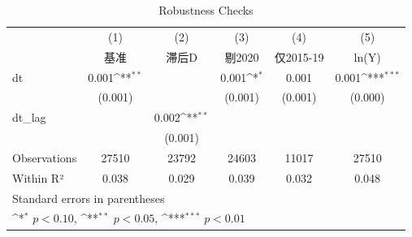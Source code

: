 \begin{table}[htbp]\centering
\def\sym#1{\ifmmode^{#1}\else\(^{#1}\)\fi}
\caption{Robustness Checks}
\begin{tabular}{l*{5}{c}}
\hline\hline
            &\multicolumn{1}{c}{(1)}&\multicolumn{1}{c}{(2)}&\multicolumn{1}{c}{(3)}&\multicolumn{1}{c}{(4)}&\multicolumn{1}{c}{(5)}\\
            &\multicolumn{1}{c}{基准}&\multicolumn{1}{c}{滞后D}&\multicolumn{1}{c}{剔2020}&\multicolumn{1}{c}{仅2015-19}&\multicolumn{1}{c}{ln(Y)}\\
\hline
dt          &       0.001\sym{**} &                     &       0.001\sym{*}  &       0.001         &       0.001\sym{***}\\
            &     (0.001)         &                     &     (0.001)         &     (0.001)         &     (0.000)         \\
[1em]
dt\_lag      &                     &       0.002\sym{**} &                     &                     &                     \\
            &                     &     (0.001)         &                     &                     &                     \\
\hline
Observations&       27510         &       23792         &       24603         &       11017         &       27510         \\
Within R²   &       0.038         &       0.029         &       0.039         &       0.032         &       0.048         \\
\hline\hline
\multicolumn{6}{l}{\footnotesize Standard errors in parentheses}\\
\multicolumn{6}{l}{\footnotesize \sym{*} \(p<0.10\), \sym{**} \(p<0.05\), \sym{***} \(p<0.01\)}\\
\end{tabular}
\end{table}
